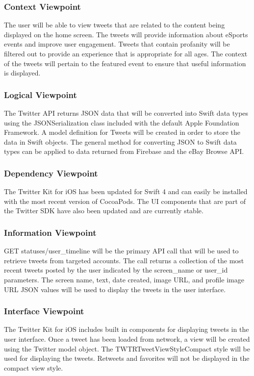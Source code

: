 \documentclass[onecolumn, draftclsnofoot,10pt, compsoc]{IEEEtran}
\begin{document}
\subsubsection{Context Viewpoint}
The user will be able to view tweets that are related to the content being displayed on the home screen. The tweets will provide information about eSports events and improve user engagement. Tweets that contain profanity will be filtered out to provide an experience that is appropriate for all ages. The context of the tweets will pertain to the featured event to ensure that useful information is displayed. 
\subsubsection{Logical Viewpoint}
The Twitter API returns JSON data that will be converted into Swift data types using the JSONSerialization class included with the default Apple Foundation Framework\cite{json}. 
A model definition for Tweets will be created in order to store the data in Swift objects. 
The general method for converting JSON to Swift data types can be applied to data returned from Firebase and the eBay Browse API.
\subsubsection{Dependency Viewpoint}
The Twitter Kit for iOS has been updated for Swift 4 and can easily be installed with the most recent version of CocoaPods. 
The UI components that are part of the Twitter SDK have also been updated and are currently stable. 
\subsubsection{Information Viewpoint}
GET statuses/user\_timeline will be the primary API call that will be used to retrieve tweets from targeted accounts. 
The call returns a collection of the most recent tweets posted by the user indicated by the screen\_name or user\_id parameters. 
The screen name, text, date created, image URL, and profile image URL JSON values will be used to display the tweets in the user interface. 
\subsubsection{Interface Viewpoint}
The Twitter Kit for iOS includes built in components for displaying tweets in the user interface. 
Once a tweet has been loaded from network, a view will be created using the Twitter model object.
The TWTRTweetViewStyleCompact style will be used for displaying the tweets.
Retweets and favorites will not be displayed in the compact view style. 
\end{document}
